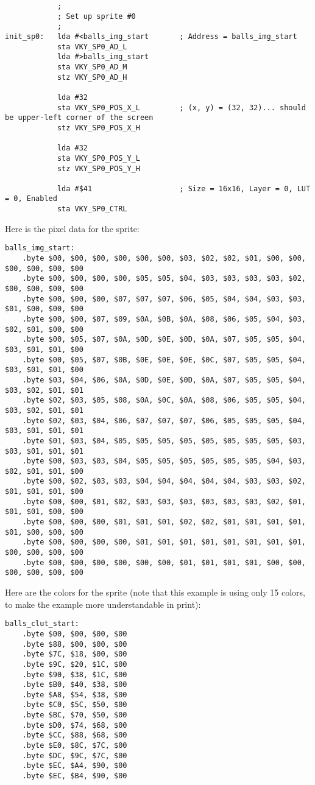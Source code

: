 \begin{verbatim}
            ;
            ; Set up sprite #0
            ;
init_sp0:   lda #<balls_img_start       ; Address = balls_img_start
            sta VKY_SP0_AD_L
            lda #>balls_img_start
            sta VKY_SP0_AD_M
            stz VKY_SP0_AD_H

            lda #32
            sta VKY_SP0_POS_X_L         ; (x, y) = (32, 32)... should be upper-left corner of the screen
            stz VKY_SP0_POS_X_H

            lda #32
            sta VKY_SP0_POS_Y_L
            stz VKY_SP0_POS_Y_H

            lda #$41                    ; Size = 16x16, Layer = 0, LUT = 0, Enabled
            sta VKY_SP0_CTRL
\end{verbatim}

Here is the pixel data for the sprite:
\begin{verbatim}
balls_img_start:
    .byte $00, $00, $00, $00, $00, $00, $03, $02, $02, $01, $00, $00, $00, $00, $00, $00
    .byte $00, $00, $00, $00, $05, $05, $04, $03, $03, $03, $03, $02, $00, $00, $00, $00
    .byte $00, $00, $00, $07, $07, $07, $06, $05, $04, $04, $03, $03, $01, $00, $00, $00
    .byte $00, $00, $07, $09, $0A, $0B, $0A, $08, $06, $05, $04, $03, $02, $01, $00, $00
    .byte $00, $05, $07, $0A, $0D, $0E, $0D, $0A, $07, $05, $05, $04, $03, $01, $01, $00
    .byte $00, $05, $07, $0B, $0E, $0E, $0E, $0C, $07, $05, $05, $04, $03, $01, $01, $00
    .byte $03, $04, $06, $0A, $0D, $0E, $0D, $0A, $07, $05, $05, $04, $03, $02, $01, $01
    .byte $02, $03, $05, $08, $0A, $0C, $0A, $08, $06, $05, $05, $04, $03, $02, $01, $01
    .byte $02, $03, $04, $06, $07, $07, $07, $06, $05, $05, $05, $04, $03, $01, $01, $01
    .byte $01, $03, $04, $05, $05, $05, $05, $05, $05, $05, $05, $03, $03, $01, $01, $01
    .byte $00, $03, $03, $04, $05, $05, $05, $05, $05, $05, $04, $03, $02, $01, $01, $00
    .byte $00, $02, $03, $03, $04, $04, $04, $04, $04, $03, $03, $02, $01, $01, $01, $00
    .byte $00, $00, $01, $02, $03, $03, $03, $03, $03, $03, $02, $01, $01, $01, $00, $00
    .byte $00, $00, $00, $01, $01, $01, $02, $02, $01, $01, $01, $01, $01, $00, $00, $00
    .byte $00, $00, $00, $00, $01, $01, $01, $01, $01, $01, $01, $01, $00, $00, $00, $00
    .byte $00, $00, $00, $00, $00, $00, $01, $01, $01, $01, $00, $00, $00, $00, $00, $00
\end{verbatim}

Here are the colors for the sprite (note that this example is using only 15 colors, to make the example more understandable in print):
\begin{verbatim}
balls_clut_start:
    .byte $00, $00, $00, $00
    .byte $88, $00, $00, $00
    .byte $7C, $18, $00, $00
    .byte $9C, $20, $1C, $00
    .byte $90, $38, $1C, $00
    .byte $B0, $40, $38, $00
    .byte $A8, $54, $38, $00
    .byte $C0, $5C, $50, $00
    .byte $BC, $70, $50, $00
    .byte $D0, $74, $68, $00
    .byte $CC, $88, $68, $00
    .byte $E0, $8C, $7C, $00
    .byte $DC, $9C, $7C, $00
    .byte $EC, $A4, $90, $00
    .byte $EC, $B4, $90, $00
\end{verbatim}

